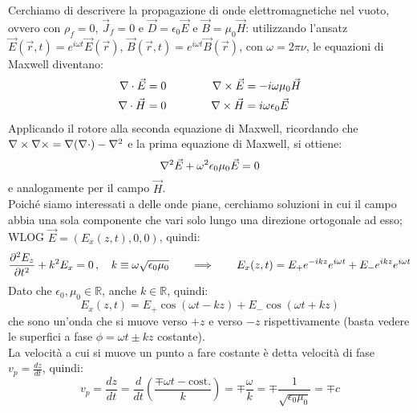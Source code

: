 \documentclass[]{article}
\begin{document}
Cerchiamo di descrivere la propagazione di onde elettromagnetiche nel vuoto, ovvero con $ \rho_f = 0 $, $ \vec{J}_f = 0 $ e $ \vec{D} = \epsilon_0 \vec{E} $ e $ \vec{B} = \mu_0 \vec{H} $: utilizzando l'ansatz $ \vec{E}(\vec{r}, t) = e^{i\omega t}\vec{E}(\vec{r}) $, $ \vec{B}(\vec{r}, t) = e^{i\omega t}\vec{B}(\vec{r}) $, con $ \omega = 2\pi \nu $, le equazioni di Maxwell diventano:
\begin{equation}
	\begin{split}
		\nabla\cdot\vec{E} &= 0 \\ 
		\nabla\cdot\vec{H} &= 0 
	\end{split}
	\qquad\qquad
	\begin{split}
		\nabla\times\vec{E} &= - i\omega \mu_0 \vec{H} \\ 
		\nabla\times\vec{H} &= i\omega \epsilon_0 \vec{E}
	\end{split}
	\label{eq:9}
\end{equation}
Applicando il rotore alla seconda equazione di Maxwell, ricordando che $ \nabla\times\nabla\times = \nabla(\nabla\cdot) - \nabla^2 $ e la prima equazione di Maxwell, si ottiene:
\begin{equation}
	\nabla^2\vec{E} + \omega^2 \epsilon_0 \mu_0 \vec{E} = 0
	\label{eq:10}
\end{equation}
e analogamente per il campo $ \vec{H} $. \\ 
%
Poiché siamo interessati a delle onde piane, cerchiamo soluzioni in cui il campo abbia una sola componente che vari solo lungo una direzione ortogonale ad esso; WLOG $ \vec{E} = (E_x (z,t), 0, 0) $, quindi:
\begin{equation}
	\frac{\partial^2 E_z}{\partial t^2} + k^2 E_x = 0 \,,\quad k \equiv \omega\sqrt{\epsilon_0\mu_0} \qquad\Longrightarrow\qquad E_x(z,t) = E_+ e^{-ikz}e^{i\omega t} + E_- e^{ikz} e^{i\omega t}
	\label{eq:11}
\end{equation}
Dato che $ \epsilon_0, \mu_0 \in \mathbb{R} $, anche $ k\in\mathbb{R} $, quindi:
\begin{equation}
	E_x(z,t) = E_+ \cos(\omega t - kz) + E_- \cos(\omega t + kz)
	\label{eq:12}
\end{equation}
che sono un'onda che si muove verso $ +z $ e verso $ -z $ rispettivamente (basta vedere le superfici a fase $ \phi = \omega t \pm kz $ costante). \\ 
La velocità a cui si muove un punto a fare costante è detta velocità di fase $ v_p = \frac{dz}{dt} $, quindi:
\begin{equation}
	v_p = \frac{dz}{dt} = \frac{d}{dt} \left(\frac{\mp \omega t - \text{cost.}}{k}\right) = \mp \frac{\omega}{k} = \mp \frac{1}{\sqrt{\epsilon_0\mu_0}} = \mp c
	\label{eq:13}
\end{equation}
\end{document}
